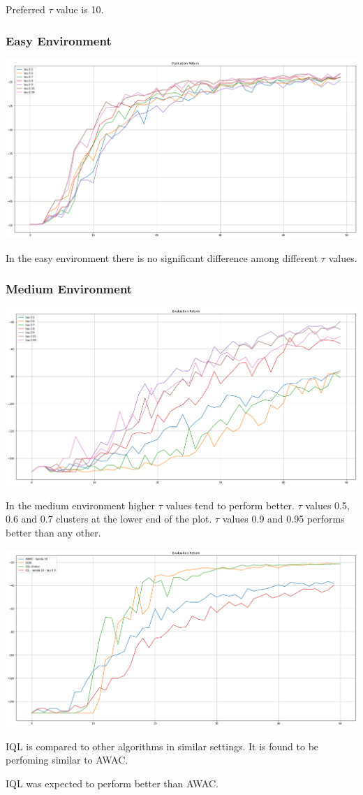 \documentclass[11pt]{article}
\begin{document}
    Preferred $\tau$ value is 10.

    \subsubsection{Easy Environment}

    \hspace*{-0.3in}
    \includegraphics[scale=0.30]{q5/eval-easy-supervised}

    In the easy environment there is no significant difference among different $\tau$ values.

    \subsubsection{Medium Environment}

    \hspace*{-0.3in}
    \includegraphics[scale=0.30]{q5/eval-medium-supervised}

    In the medium environment higher $\tau$ values tend to perform better.
    $\tau$ values 0.5, 0.6 and 0.7 clusters at the lower end of the plot.
    $\tau$ values 0.9 and 0.95 performs better than any other.

    \hspace*{-0.3in}
    \includegraphics[scale=0.30]{q5/eval-medium-supervised-compared}

    IQL is compared to other algorithms in similar settings.
    It is found to be perfoming similar to AWAC.

    IQL was expected to perform better than AWAC.
\end{document}
